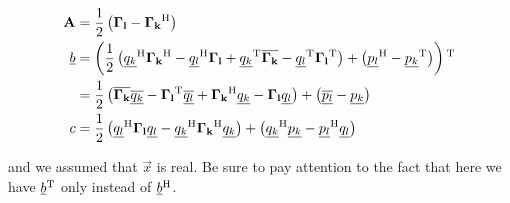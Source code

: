 \documentclass[a4paper,10pt]{article}
\begin{document}
\begin{equation} \label{eq:combined_oscillators}
\begin{split}
  \mathbf{A} & = \frac{1}{2} \left(\mathbf{\Gamma_l} - \mathbf{\Gamma_k}{}^{\textnormal{H}} \right) \\
  \underline{b} & = \left(\frac{1}{2} \left(
                                  \underline{q_k}{}^{\textnormal{H}} \mathbf{\Gamma_k}{}^{\textnormal{H}}
                                 -\underline{q_l}{}^{\textnormal{H}} \mathbf{\Gamma_l}
                                 +\underline{q_k}{}^{\textnormal{T}} \overline{\mathbf{\Gamma_k}}
                                 -\underline{q_l}{}^{\textnormal{T}} \mathbf{\Gamma_l}{}^{\textnormal{T}}
                                \right)
                + \left(\underline{p_l}{}^{\textnormal{H}} - \underline{p_k}{}^{\textnormal{T}}\right)
              \right){}^{\textnormal{T}} \\
          & = \frac{1}{2} \left(
                            \overline{\mathbf{\Gamma_k}} \overline{\underline{q_k}}
                           -\mathbf{\Gamma_l}{}^{\textnormal{T}} \overline{\underline{q_l}}
                           +\mathbf{\Gamma_k}{}^{\textnormal{H}} \underline{q_k}
                           -\mathbf{\Gamma_l} \underline{q_l}
                          \right)
              + \left(\overline{\underline{p_l}} - \underline{p_k}\right) \\
  c & = \frac{1}{2} \left(
                      \underline{q_l}{}^{\textnormal{H}} \mathbf{\Gamma_l} \underline{q_l}
                     -\underline{q_k}{}^{\textnormal{H}} \mathbf{\Gamma_k}{}^{\textnormal{H}} \underline{q_k}
                    \right)
        + \left(\underline{q_k}{}^{\textnormal{H}} \underline{p_k} - \underline{p_l}{}^{\textnormal{H}} \underline{q_l}\right)
\end{split}
\end{equation}


and we assumed that $\vec{x}$ is real. Be sure to pay attention to
the fact that here we have $\underline{b}{}^{\textnormal{T}}$ only instead of $\underline{b}{}^{\textnormal{H}}$.
\end{document}
